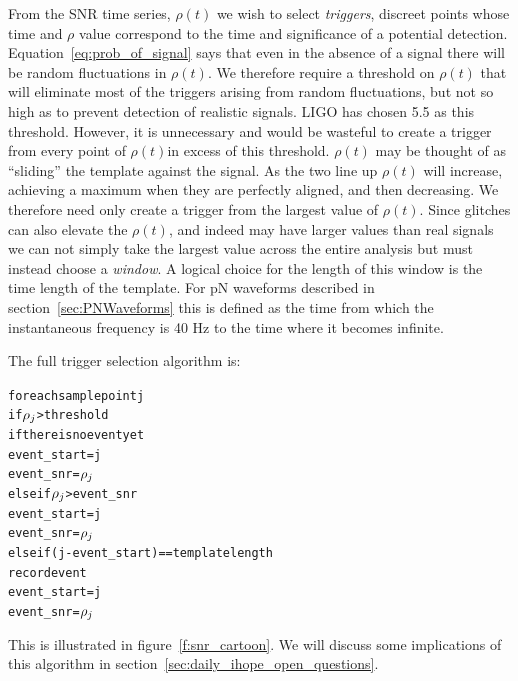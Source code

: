From the SNR time series, $\rho(t)$ we wish to select \emph{triggers},
discreet points whose time and $\rho$ value correspond to the time and
significance of a potential detection.
Equation~\ref{eq:prob_of_signal} says that even in the absence of a
signal there will be random fluctuations in $\rho(t)$.  We therefore
require a threshold on $\rho(t)$ that will eliminate most of the
triggers arising from random fluctuations, but not so high as to
prevent detection of realistic signals.  LIGO has chosen 5.5 as this
threshold.  However, it is unnecessary and would be wasteful to create
a trigger from every point of $\rho(t)$in excess of this threshold.
$\rho(t)$ may be thought of as ``sliding'' the template against the
signal.  As the two line up $\rho(t)$ will increase, achieving a
maximum when they are perfectly aligned, and then decreasing.  We
therefore need only create a trigger from the largest value of
$\rho(t)$.  Since glitches can also elevate the $\rho(t)$, and indeed
may have larger values than real signals we can not simply take the
largest value across the entire analysis but must instead choose a
\emph{window}.  A logical choice for the length of this window is the
time length of the template.  For pN waveforms described in
section~\ref{sec:PNWaveforms} this is defined as the time from which
the instantaneous frequency is 40 Hz to the time where it becomes
infinite.

The full trigger selection algorithm is:
\newpage

\begin{alltt}
for each sample point j
  if \(\rho\sb{j}\) > threshold
    if there is no event yet
      event\_start = j
      event\_snr   = \(\rho\sb{j}\)
    else if \(\rho\sb{j}\) > event\_snr
      event\_start = j
      event\_snr = \(\rho\sb{j}\)
    else if (j - event\_start) == template length
      record event
      event\_start = j
      event\_snr   = \(\rho\sb{j}\)
\end{alltt}
%
This is illustrated in figure~\ref{f:snr_cartoon}.  We will discuss
some implications of this algorithm in
section~\ref{sec:daily_ihope_open_questions}.


